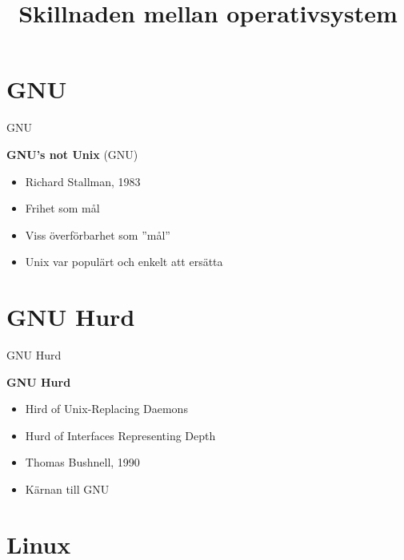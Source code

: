 \documentclass[compress, final]{beamer}
\title{Skillnaden mellan operativsystem}
\date{}
\begin{document}
\begin{frame}
  \titlepage
\end{frame}


\section{GNU}

\begin{frame}{GNU}
  \begin{minipage}[l]{0.60\textwidth}
    \textbf{GNU's not Unix} (GNU)
    \begin{itemize}
      \item Richard Stallman, 1983
      \item Frihet som mål
      \item Viss överförbarhet som ''mål''
      \item Unix var populärt och enkelt att ersätta
    \end{itemize}
  \end{minipage}
  \begin{minipage}[r]{0.35\textwidth}
  \end{minipage}
\end{frame}


\section{GNU Hurd}

\begin{frame}{GNU Hurd}
  \begin{minipage}[l]{0.60\textwidth}
    \textbf{GNU Hurd}
    \begin{itemize}
      \item Hird of Unix-Replacing Daemons
      \item Hurd of Interfaces Representing Depth
      \item Thomas Bushnell, 1990
      \item Kärnan till GNU
    \end{itemize}
  \end{minipage}
  \begin{minipage}[r]{0.35\textwidth}
  \end{minipage}
\end{frame}


\section{Linux}
\end{document}
